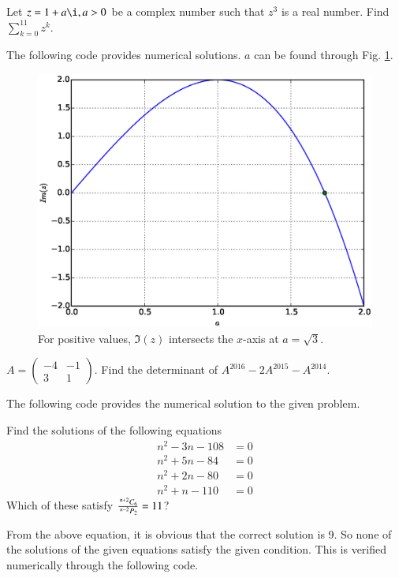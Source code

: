 \documentclass[journal,12pt,twocolumn]{IEEEtran}
\begin{document}
\begin{problem}
Let $z = 1 + a \i, a > 0$  be a complex number such that $z^3$ is a real number. Find $\sum_{k = 0}^{11}z^k$.
\end{problem}
\solution

The following code provides numerical solutions.  $a$ can be found through Fig. \ref{fig_16}.

\begin{figure}[h]
\centering
\includegraphics[width=\columnwidth]{./figs/ee16b1016}
\caption{ For positive values, $\Im(z)$ intersects the $x$-axis at $a = \sqrt{3}$.}
\label{fig_16}	
\end{figure}
%
\begin{problem}
$A = 
\begin{pmatrix}
-4 & -1 \\
3 & 1
\end{pmatrix}
$.
Find the determinant of $A^{2016}-2A^{2015}-A^{2014}$.
\end{problem}
%
\solution

The following code provides the numerical solution to the given problem.

%
\begin{problem}
Find the solutions of the following equations
\begin{align*}
n^2-3n-108 &= 0 \\
n^2 + 5n -84 &= 0 \\
n^2 + 2n - 80 &=0 \\
n^2+n-110 &= 0
\end{align*}
Which of these satisfy $\frac{\,^{n+2}C_{6}}{\,^{n-2}P_{2}} = 11$?
\end{problem}		
%
%
\solution

From the above equation, it is obvious that the correct solution is 9.  So none of the solutions
of the given equations satisfy the given condition.  This is verified numerically through the following code.

%
\end{document}
